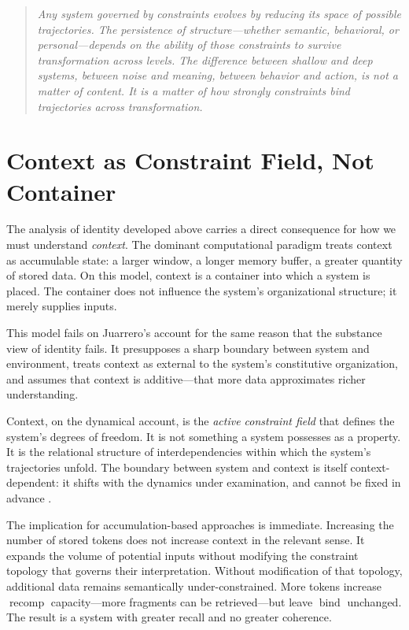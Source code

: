 \documentclass[11pt]{article}
\newcommand{\bind}{\operatorname{bind}}
\newcommand{\recomp}{\operatorname{recomp}}
\begin{document}
\begin{quote}
\itshape
Any system governed by constraints evolves by reducing its space of possible trajectories.
The persistence of structure—whether semantic, behavioral, or personal—depends on the
ability of those constraints to survive transformation across levels. The difference
between shallow and deep systems, between noise and meaning, between behavior and action,
is not a matter of content. It is a matter of how strongly constraints bind trajectories
across transformation.
\end{quote}

\section{Context as Constraint Field, Not Container}

The analysis of identity developed above carries a direct consequence for how we must
understand \emph{context}. The dominant computational paradigm treats context as
accumulable state: a larger window, a longer memory buffer, a greater quantity of stored
data. On this model, context is a container into which a system is placed. The container
does not influence the system's organizational structure; it merely supplies inputs.

This model fails on Juarrero's account for the same reason that the substance view of
identity fails. It presupposes a sharp boundary between system and environment, treats
context as external to the system's constitutive organization, and assumes that
context is additive—that more data approximates richer understanding.

Context, on the dynamical account, is the \emph{active constraint field} that defines
the system's degrees of freedom. It is not something a system possesses as a property.
It is the relational structure of interdependencies within which the system's trajectories
unfold. The boundary between system and context is itself context-dependent: it shifts
with the dynamics under examination, and cannot be fixed in advance \citep{clark1997,varela1991}.

The implication for accumulation-based approaches is immediate. Increasing the number of
stored tokens does not increase context in the relevant sense. It expands the volume of
potential inputs without modifying the constraint topology that governs their interpretation.
Without modification of that topology, additional data remains semantically under-constrained.
More tokens increase $\recomp$ capacity—more fragments can be retrieved—but leave $\bind$
unchanged. The result is a system with greater recall and no greater coherence.
\end{document}
